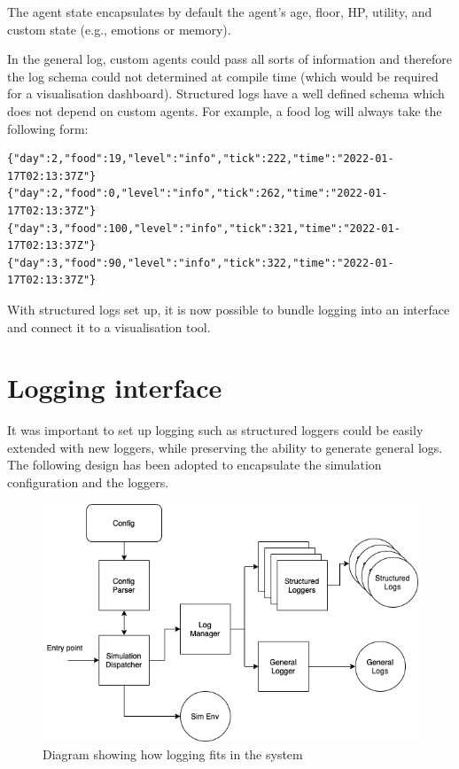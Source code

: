 The agent state encapsulates by default the agent's age, floor, HP, utility, and custom state (e.g., emotions or memory).

In the general log, custom agents could pass all sorts of information and therefore the log schema could not determined at compile time (which would be required for a visualisation dashboard). Structured logs have a well defined schema which does not depend on custom agents. For example, a food log will always take the following form:

\begin{verbatim}
{"day":2,"food":19,"level":"info","tick":222,"time":"2022-01-17T02:13:37Z"}
{"day":2,"food":0,"level":"info","tick":262,"time":"2022-01-17T02:13:37Z"}
{"day":3,"food":100,"level":"info","tick":321,"time":"2022-01-17T02:13:37Z"}
{"day":3,"food":90,"level":"info","tick":322,"time":"2022-01-17T02:13:37Z"}
\end{verbatim}

With structured logs set up, it is now possible to bundle logging into an interface and connect it to a visualisation tool.

\section{Logging interface}

It was important to set up logging such as structured loggers could be easily extended with new loggers, while preserving the ability to generate general logs. The following design has been adopted to encapsulate the simulation configuration and the loggers.

\begin{figure}[htb]
    \centering
    \includegraphics[width=0.8\linewidth]{003_data_logging/images/struct.png}
    \caption{Diagram showing how logging fits in the system}
    \label{fig:design_logging}
\end{figure}

